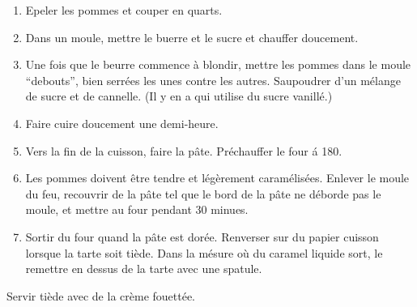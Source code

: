 \begin{recipe}
  \begin{enumerate}

  \item Epeler les pommes et couper en quarts.

  \item Dans un moule, mettre le buerre et le sucre et chauffer doucement.

  \item Une fois que le beurre commence \`a blondir, mettre les pommes
    dans le moule ``debouts'', bien serr\'ees les unes contre les
    autres.  Saupoudrer d'un m\'elange de sucre et de cannelle.  (Il y
    en a qui utilise du sucre vanill\'e.)

  \item Faire cuire doucement une demi-heure.

  \item Vers la fin de la cuisson, faire la p\^ate.  Pr\'echauffer le
    four \'a 180\C.

  \item Les pommes doivent \^etre tendre et l\'eg\`erement
    caram\'elis\'ees.  Enlever le moule du feu, recouvrir de la p\^ate
    tel que le bord de la p\^ate ne d\'eborde pas le moule, et mettre
    au four pendant 30 minues.

  \item Sortir du four quand la p\^ate est dor\'ee.  Renverser sur du
    papier cuisson lorsque la tarte soit ti\`ede.  Dans la m\'esure o\`u
    du caramel liquide sort, le remettre en dessus de la tarte avec
    une spatule.

  \end{enumerate}

  Servir ti\`ede avec de la cr\`eme fouett\'ee.
\end{recipe}




